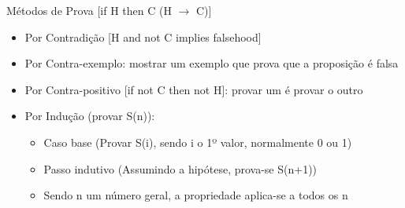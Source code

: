 \documentclass[../resumosTCOM.tex]{subfiles}
\begin{document}
 

Métodos de Prova [if H then C (H \(\rightarrow\) C)]
\begin{itemize}
    \item Por Contradição [H and not C implies falsehood]
    \item Por Contra-exemplo: mostrar um exemplo que prova que a proposição é falsa
    \item Por Contra-positivo [if not C then not H]: provar um é provar o outro
    \item Por Indução (provar S(n)):
    \begin{itemize}
        \item Caso base (Provar S(i), sendo i o 1º valor, normalmente 0 ou 1)
        \item Passo indutivo (Assumindo a hipótese, prova-se S(n+1))
        \item Sendo n um número geral, a propriedade aplica-se a todos os n
    \end{itemize}
\end{itemize}
\end{document}
